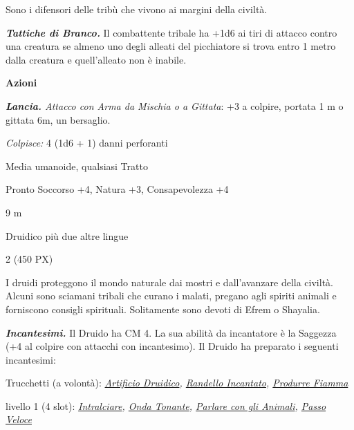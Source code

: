 \begin{multicols}{2}
{Sono i difensori delle tribù che vivono ai margini della civiltà.

\emph{\textbf{Tattiche di Branco.}} Il combattente tribale ha +1d6 ai tiri di attacco contro una creatura se almeno uno degli alleati del picchiatore si trova entro 1 metro dalla creatura e quell'alleato non è inabile.

\textbf{Azioni}

\emph{\textbf{Lancia.} Attacco con Arma da Mischia o a Gittata}: +3 a colpire, portata 1 m o gittata 6m, un bersaglio.

\emph{Colpisce:} 4 (1d6 + 1) danni perforanti

\begin{description}[noitemsep, topsep=0pt, parsep=0pt, partopsep=0pt, itemsep=1pt, leftmargin=2.35cm,  labelwidth=2.2cm, itemindent=0cm, listparindent=0pt] %
\setlength{\baselineskip}{10pt}
\item[\textbf{Taglia/Tipo}] Media umanoide, qualsiasi Tratto
\item[\textbf{Caratt.}] 
\item[\textbf{Punti Ferita}] 
\item[\textbf{Comp.}] Pronto Soccorso +4, Natura +3, Consapevolezza +4
\item[\textbf{Tiri Salvez.}] 
\item[\textbf{Movimento}] 9 m
\item[\textbf{Linguaggi}] Druidico più due altre lingue
\item[\textbf{Sfida}] 2 (450 PX)
\end{description}
\smallskip

I druidi proteggono il mondo naturale dai mostri e dall'avanzare della civiltà. Alcuni sono sciamani tribali che curano i malati, pregano agli spiriti animali e forniscono consigli spirituali. Solitamente sono devoti di Efrem o Shayalia.

\emph{\textbf{Incantesimi.}} Il Druido ha CM 4. La sua abilità da incantatore è la Saggezza (+4 al colpire con attacchi con incantesimo). Il Druido ha preparato i seguenti incantesimi:

Trucchetti (a volontà): \emph{\hyperlink{Artificio Druidico}{Artificio Druidico}, \hyperlink{Randello Incantato}{Randello Incantato}, \hyperlink{Produrre Fiamma}{Produrre Fiamma}}

livello 1 (4 slot): \emph{\hyperlink{Intralciare}{Intralciare}, \hyperlink{Onda Tonante}{Onda Tonante}, \hyperlink{Parlare con gli Animali}{Parlare con gli Animali}, \hyperlink{Passo Veloce}{Passo Veloce}}

}
\end{multicols}
